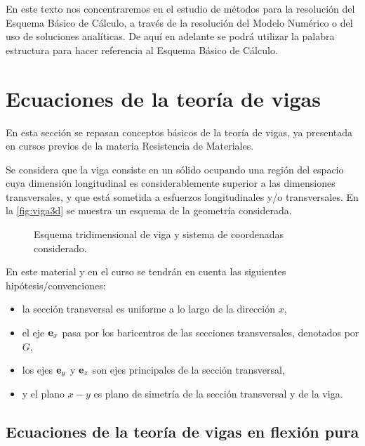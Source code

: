 En este texto nos concentraremos en el estudio de métodos para la resolución del Esquema Básico de Cálculo, a través de la resolución del Modelo Numérico o del uso de soluciones analíticas. %
%
De aquí en adelante se podrá utilizar la palabra estructura para hacer referencia al Esquema Básico de Cálculo.











\section{Ecuaciones de la teoría de vigas} \label{sec:teovigastimo}

En esta sección se repasan conceptos básicos de la teoría de vigas, ya presentada en cursos previos de la materia Resistencia de Materiales. %

Se considera que la viga consiste en un sólido ocupando una región del espacio cuya dimensión longitudinal es considerablemente superior a las dimensiones transversales, y que está sometida a esfuerzos longitudinales y/o transversales. %
%
En la \autoref{fig:viga3d} se muestra un esquema de la geometría considerada. %
%
\begin{figure}[htb]
	\centering
	\def\svgwidth{0.5\textwidth}
	
	\caption{Esquema tridimensional de viga y sistema de coordenadas considerado.}
	\label{fig:viga3d}
\end{figure}

%
En este material y en el curso se tendrán en cuenta las siguientes hipótesis/convenciones:
%
\begin{itemize}
	\item la sección transversal es uniforme a lo largo de la dirección $x$, %
	\item el eje ${\bf e}_x$ pasa por los baricentros de las secciones transversales, denotados por $G$,
	\item los ejes ${\bf e}_y$ y ${\bf e}_z$ son ejes principales de la sección transversal,
	\item y el plano $x-y$ es plano de simetría de la sección transversal y de la viga.
\end{itemize}


\subsection{Ecuaciones de la teoría de vigas en flexión pura}


